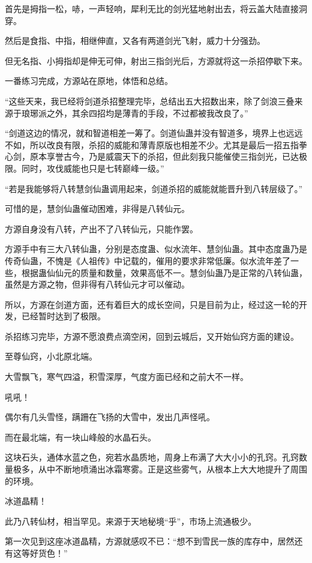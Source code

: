 \begin{this_body}
首先是拇指一松，哧，一声轻响，犀利无比的剑光猛地射出去，将云盖大陆直接洞穿。

然后是食指、中指，相继伸直，又各有两道剑光飞射，威力十分强劲。

但无名指、小拇指却是伸无可伸，射出三指剑光后，方源就将这一杀招停歇下来。

一番练习完成，方源站在原地，体悟和总结。

“这些天来，我已经将剑道杀招整理完毕，总结出五大招数出来，除了剑浪三叠来源于琅琊派之外，其余四招均是薄青的手段，不过都被我改良了。”

“剑道这边的情况，就和智道相差一筹了。剑道仙蛊并没有智道多，境界上也远远不如，所以改良有限，杀招的威能和薄青原版也相差不少。尤其是最后一招五指拳心剑，原本享誉古今，乃是威震天下的杀招，但此刻我只能催使三指剑光，已达极限。同时，攻伐威能也只是七转巅峰一级。”

“若是我能够将八转慧剑仙蛊调用起来，剑道杀招的威能就能晋升到八转层级了。”

可惜的是，慧剑仙蛊催动困难，非得是八转仙元。

方源自身没有八转，产出不了八转仙元，只能作罢。

方源手中有三大八转仙蛊，分别是态度蛊、似水流年、慧剑仙蛊。其中态度蛊乃是传奇仙蛊，不愧是《人祖传》中记载的，催用的要求非常低廉。似水流年差了一些，根据蛊仙仙元的质量和数量，效果高低不一。慧剑仙蛊乃是正常的八转仙蛊，虽然是方源之物，但非得有八转仙元才可以催动。

所以，方源在剑道方面，还有着巨大的成长空间，只是目前为止，经过这一轮的开发，已经暂时达到了极限。

杀招练习完毕，方源不愿浪费点滴空闲，回到云城后，又开始仙窍方面的建设。

至尊仙窍，小北原北端。

大雪飘飞，寒气四溢，积雪深厚，气度方面已经和之前大不一样。

吼吼！

偶尔有几头雪怪，蹒跚在飞扬的大雪中，发出几声怪吼。

而在最北端，有一块山峰般的水晶石头。

这块石头，通体水蓝之色，宛若水晶质地，周身上布满了大大小小的孔窍。孔窍数量极多，从中不断地喷涌出冰霜寒雾。正是这些雾气，从根本上大大地提升了周围的环境。

冰道晶精！

此乃八转仙材，相当罕见。来源于天地秘境“乎”，市场上流通极少。

第一次见到这座冰道晶精，方源就感叹不已：“想不到雪民一族的库存中，居然还有这等好货色！”


\end{this_body}
